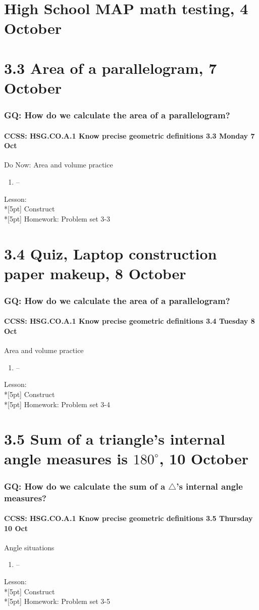 \documentclass{beamer}
\begin{document}
  \section{High School MAP math testing, 4 October}

  \section{3.3 Area of a parallelogram, 7 October}
    \frame
    {
      \frametitle{GQ: How do we calculate the area of a parallelogram?}
      \framesubtitle{CCSS: HSG.CO.A.1 Know precise geometric definitions \hfill \alert{3.3 Monday 7 Oct}}

      \begin{block}{Do Now: Area and volume practice}
      \begin{enumerate}
        \item --
      \end{enumerate}
      \end{block}
      Lesson:   \\*[5pt]
      Construct\\*[5pt]
      Homework: Problem set 3-3
    }

  \section{3.4 Quiz, Laptop construction paper makeup, 8 October}
    \frame
    {
      \frametitle{GQ: How do we calculate the area of a parallelogram?}
      \framesubtitle{CCSS: HSG.CO.A.1 Know precise geometric definitions \hfill \alert{3.4 Tuesday 8 Oct}}

      \begin{block}{Area and volume practice}
      \begin{enumerate}
        \item --
      \end{enumerate}
      \end{block}
      Lesson:   \\*[5pt]
      Construct\\*[5pt]
      Homework: Problem set 3-4
    }

  \section{3.5 Sum of a triangle's internal angle measures is $180^\circ$, 10 October}
    \frame
    {
      \frametitle{GQ: How do we calculate the sum of a $\triangle$'s internal angle measures?}
      \framesubtitle{CCSS: HSG.CO.A.1 Know precise geometric definitions \hfill \alert{3.5 Thursday 10 Oct}}

      \begin{block}{Angle situations}
      \begin{enumerate}
        \item --
      \end{enumerate}
      \end{block}
      Lesson:   \\*[5pt]
      Construct\\*[5pt]
      Homework: Problem set 3-5
    }
\end{document}
